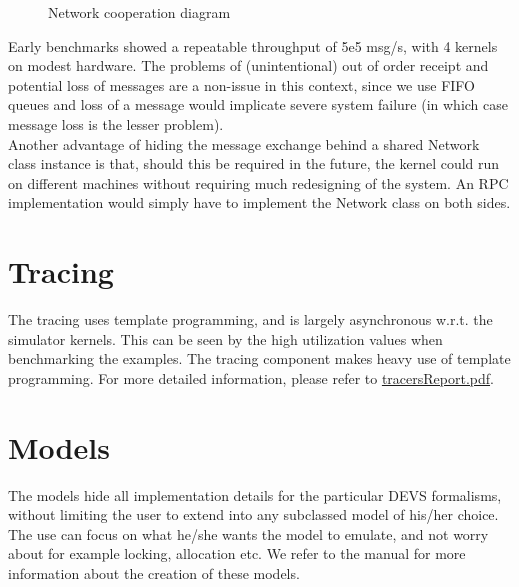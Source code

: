 \documentclass[8pt,a4paper]{report}
\begin{document}
\begin{figure}[h!]
	\caption{Network cooperation diagram}
	\label{networkdesign}
\end{figure} 
Early benchmarks showed a repeatable throughput of 5e5 msg/s, with 4 kernels on modest hardware. The problems of (unintentional) out of order receipt and potential loss of messages are a non-issue in this context, since we use FIFO queues and loss of a message would implicate severe system failure (in which case message loss is the lesser problem).\\
Another advantage of hiding the message exchange behind a shared Network class instance is that, should this be required in the future, the kernel could run on different machines without requiring much redesigning of the system. An RPC implementation would simply have to implement the Network class on both sides.

\section{Tracing}
The tracing uses template programming, and is largely asynchronous w.r.t. the simulator kernels. This can be seen by the high utilization values when benchmarking the examples.
The tracing component makes heavy use of template programming. For more detailed information, please refer to \href{run:./tracersReport.pdf}{tracersReport.pdf}.

\section{Models}
The models hide all implementation details for the particular DEVS formalisms, without limiting the user to extend into any subclassed model of his/her choice. The use can focus on what he/she wants the model to emulate, and not worry about for example locking, allocation etc. We refer to the manual for more information about the creation of these models.
\end{document}
